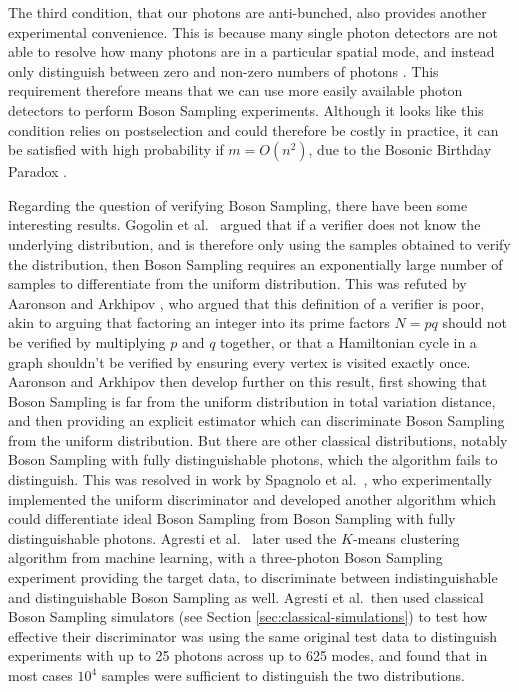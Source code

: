 The third condition, that our photons are anti-bunched, also provides another experimental convenience. This is because many single photon detectors are not able to resolve how many photons are in a particular spatial mode, and instead only distinguish between zero and non-zero numbers of photons \cite{itzler2011, natarajan2012}. This requirement therefore means that we can use more easily available photon detectors to perform Boson Sampling experiments. Although it looks like this condition relies on postselection and could therefore be costly in practice, it can be satisfied with high probability if $m=O(n^2)$, due to the Bosonic Birthday Paradox \cite{arkhipov2011}.

Regarding the question of verifying Boson Sampling, there have been some interesting results. Gogolin et al.~\cite{gogolin2013} argued that if a verifier does not know the underlying distribution, and is therefore only using the samples obtained to verify the distribution, then Boson Sampling requires an exponentially large number of samples to differentiate from the uniform distribution. This was refuted by Aaronson and Arkhipov \cite{aaronson2014}, who argued that this definition of a verifier is poor, akin to arguing that factoring an integer into its prime factors $N=pq$ should not be verified by multiplying $p$ and $q$ together, or that a Hamiltonian cycle in a graph shouldn't be verified by ensuring every vertex is visited exactly once. Aaronson and Arkhipov then develop further on this result, first showing that Boson Sampling is far from the uniform distribution in total variation distance, and then providing an explicit estimator which can discriminate Boson Sampling from the uniform distribution. But there are other classical distributions, notably Boson Sampling with fully distinguishable photons, which the algorithm fails to distinguish. This was resolved in work by Spagnolo et al.~\cite{spagnolo2014}, who experimentally implemented the uniform discriminator and developed another algorithm which could differentiate ideal Boson Sampling from Boson Sampling with fully distinguishable photons. Agresti et al.~\cite{agresti2019} later used the $K$-means clustering algorithm from machine learning, with a three-photon Boson Sampling experiment providing the target data, to discriminate between indistinguishable and distinguishable Boson Sampling as well. Agresti et al.\ then used classical Boson Sampling simulators (see Section \ref{sec:classical-simulations}) to test how effective their discriminator was using the same original test data to distinguish experiments with up to 25 photons across up to 625 modes, and found that in most cases $10^4$ samples were sufficient to distinguish the two distributions.

